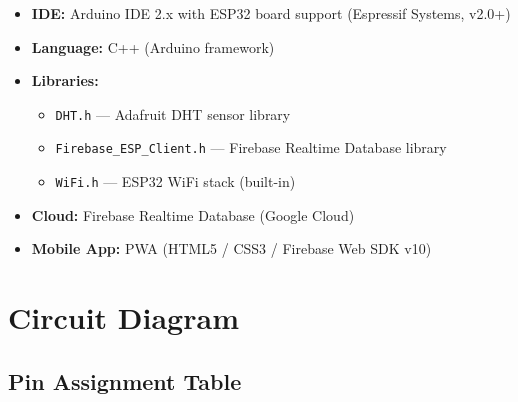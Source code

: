 \documentclass[12pt,a4paper]{article}
\begin{document}
\begin{itemize}[leftmargin=1.5cm]
  \item \textbf{IDE:} Arduino IDE 2.x with ESP32 board support (Espressif Systems, v2.0+)
  \item \textbf{Language:} C++ (Arduino framework)
  \item \textbf{Libraries:}
    \begin{itemize}
      \item \texttt{DHT.h} — Adafruit DHT sensor library
      \item \texttt{Firebase\_ESP\_Client.h} — Firebase Realtime Database library
      \item \texttt{WiFi.h} — ESP32 WiFi stack (built-in)
    \end{itemize}
  \item \textbf{Cloud:} Firebase Realtime Database (Google Cloud)
  \item \textbf{Mobile App:} PWA (HTML5 / CSS3 / Firebase Web SDK v10)
\end{itemize}

\newpage

\section{Circuit Diagram}

\subsection{Pin Assignment Table}
\end{document}
